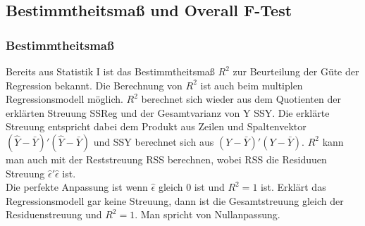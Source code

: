 \documentclass[a4paper]{article}
\begin{document}
\subsection{Bestimmtheitsmaß und Overall F-Test}
\subsubsection{Bestimmtheitsmaß}
Bereits aus Statistik I ist das Bestimmtheitsmaß $R^2$ zur Beurteilung der Güte der Regression bekannt. Die Berechnung von $R^2$ ist auch beim multiplen Regressionsmodell möglich. $R^2$ berechnet sich wieder aus dem Quotienten der erklärten Streuung SSReg und der Gesamtvarianz von Y SSY. Die erklärte Streuung entspricht dabei dem Produkt aus Zeilen und Spaltenvektor $(\hat Y-\bar Y)'(\hat Y-\bar Y)$ und SSY berechnet sich aus $(Y-\bar Y)'(Y-\bar Y)$.  $R^2$ kann man auch mit der Reststreuung RSS berechnen, wobei RSS die Residuuen Streuung $\hat\epsilon'\hat\epsilon$ ist.\\
Die perfekte Anpassung ist wenn $\hat\epsilon$ gleich 0 ist und $R^2=1$ ist. Erklärt das Regressionsmodell gar keine Streuung, dann ist die Gesamtstreuung gleich der Residuenstreuung und $R^2=1$. Man spricht von Nullanpassung.
\end{document}
